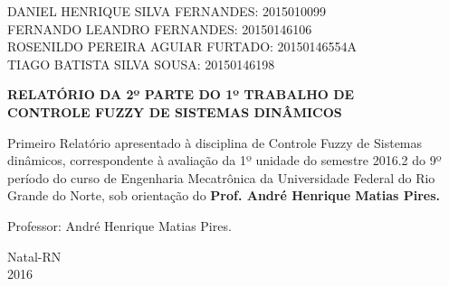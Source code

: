 \documentclass[a4paper,12pt]{article}
\begin{document}
\newpage


\thispagestyle{empty}

\begin{center}
\begin{normalsize}
DANIEL HENRIQUE SILVA FERNANDES: 2015010099\\
\vspace{0.8cm}
FERNANDO LEANDRO FERNANDES: 20150146106\\
\vspace{0.8cm}
ROSENILDO PEREIRA AGUIAR FURTADO: 20150146554A\\
\vspace{0.8cm}
TIAGO BATISTA SILVA SOUSA: 20150146198\\

\end{normalsize}
\end{center}
\vspace{6cm}

{\bf{\large {\centering RELATÓRIO DA 2º PARTE DO 1º TRABALHO DE\\
CONTROLE FUZZY DE SISTEMAS DINÂMICOS\\}}}

\vspace{2cm}

\begin{adjustwidth}{7.5cm}{0cm}

{\normalsize

Primeiro Relatório apresentado à disciplina de
Controle Fuzzy de Sistemas dinâmicos, correspondente à
avaliação da 1º unidade do semestre 2016.2 do 9º período
do curso de Engenharia Mecatrônica da
Universidade Federal do Rio Grande do Norte, sob
orientação do {\bf Prof. André Henrique Matias Pires.}

}

\end{adjustwidth}

\vspace{1.5cm}

\begin{center}

Professor: André Henrique Matias Pires.

\vspace{3.5cm}

{\large Natal-RN\\
2016}

\end{center}
\end{document}
